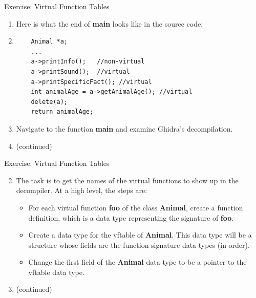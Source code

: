 \documentclass{beamer}
\begin{document}
\begin{frame}[fragile]
\begin{block}{Exercise: Virtual Function Tables}
\begin{enumerate}
\item  Here is what the end of \textbf{main} looks like in the source code:
\label{snippet}
\item[]
\begin{verbatim}
    Animal *a;
    ...
    a->printInfo();   //non-virtual
    a->printSound();  //virtual
    a->printSpecificFact(); //virtual
    int animalAge = a->getAnimalAge(); //virtual
    delete(a);
    return animalAge;
\end{verbatim}
\item[] Navigate to the function \textbf{main} and examine Ghidra's decompilation.
\item[] (continued)
\end{enumerate}
\end{block}
\end{frame}

\begin{frame}
\begin{block}{Exercise: Virtual Function Tables}
\begin{enumerate}
\setcounter{enumi}{1}
\item The task is to get the names of the virtual functions to show up in the decompiler. At a high level, the steps are:
\begin{itemize}
\item For each virtual function \textbf{foo} of the class \textbf{Animal}, create a function definition, which is a data type representing the signature of \textbf{foo}.
\item Create a data type for the vftable of \textbf{Animal}. This data type will be a structure whose fields are the function signature data types (in order).
\item Change the first field of the \textbf{Animal} data type to be a pointer to the vftable data type.
\end{itemize}
\item[] (continued)
\end{enumerate}
\end{block}
\end{frame}
\end{document}
